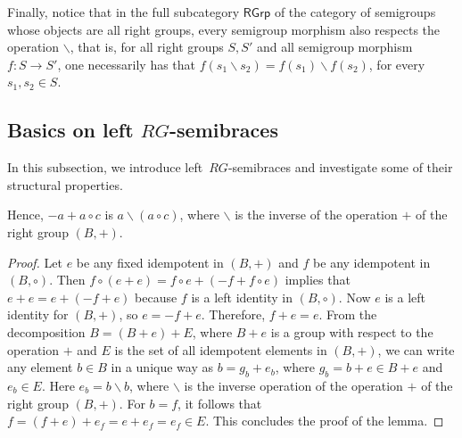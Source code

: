 \documentclass[11pt]{amsart}
\newcommand{\RGrp}{\mathsf{RGrp}}
\newtheorem{lemma}[theorem]{Lemma}
\newtheorem{definition}[theorem]{Definition}
\theoremstyle{definition}
\begin{document}
\medskip

Finally, notice that in the full subcategory $\RGrp$ of the category of semigroups whose objects are all right groups, every semigroup morphism also respects the operation $\backslash$, that is, for all right groups $S,S'$ and all semigroup morphism $f\colon S\to S'$, one necessarily has that $f(s_1\backslash s_2)=f(s_1)\backslash f(s_2)$, for every $s_1,s_2\in S$.

\smallskip

\subsection{Basics on left \texorpdfstring{$RG$-}{-}semibraces}
 
In this subsection, we introduce left~$RG$-se\-mi\-bra\-ces and investigate some of their structural properties.

Hence, $-a+ a\circ c$ is  $ a\backslash (a \circ c)$, where $\backslash$ is the inverse of the operation $+$ of the right group $(B,+)$.


\begin{proof}
    Let $e$ be any fixed idempotent in $(B,+)$ and $f$  be any idempotent in $(B,\circ)$. Then $f\circ (e+ e) = f\circ e+(-f+ f\circ e)$ implies that $e+e=e+(-f+ e)$ because $f$ is a left identity in $(B,\circ)$. Now $e$ is a left identity for $(B,+)$, so $e=-f+e$. Therefore,  $f+e=e$. From the decomposition $B=(B+e)+E$, where $B+e$ is a group with respect to the operation $+$ and $E$ is the set of all idempotent elements in $(B,+)$, we can write any element $b\in B$ in a unique way as $b = g_b + e_b$,
where $g_b=b+e\in B+e$ and $e_b\in E$. Here $e_b=b\backslash b$, where $\backslash$ is the inverse operation of the operation $+$ of the right group $(B,+)$. For $b=f$, it follows that $f=(f+e)+e_f=e+e_f=e_f\in E$. This concludes the proof of the lemma.
\end{proof}
\end{document}
